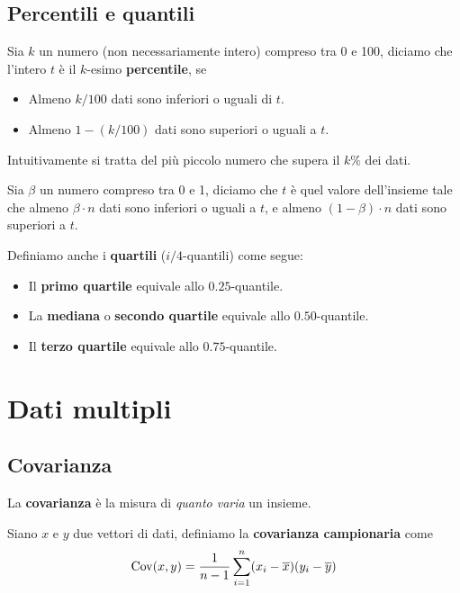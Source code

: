 \subsection{Percentili e quantili}

\begin{definition}
	Sia $k$ un numero (non necessariamente intero) compreso tra 0 e 100, diciamo che l'intero $t$
	è il $k$-esimo
	\textbf{percentile}, se
	\begin{itemize}
		\item Almeno $k / 100$ dati sono inferiori o uguali di $t$.
		\item Almeno $1 - (k / 100)$ dati sono superiori o uguali a $t$.
	\end{itemize}
	Intuitivamente si tratta del più piccolo numero che supera il $k \%$ dei dati.
\end{definition}

\begin{definition}
	Sia $\beta$ un numero compreso tra 0 e 1, diciamo che $t$ è quel valore dell'insieme tale che
	almeno $\beta \cdot n$ dati sono inferiori o uguali a $t$, e almeno $(1-\beta) \cdot n$ dati
	sono superiori a $t$.
\end{definition}

\begin{definition}
	Definiamo anche i \textbf{quartili} ($i/4$-quantili) come segue:
	\begin{itemize}
		\item Il \textbf{primo quartile} equivale allo $0.25$-quantile.
		\item La \textbf{mediana} o \textbf{secondo quartile} equivale allo $0.50$-quantile.
		\item Il \textbf{terzo quartile} equivale allo $0.75$-quantile.
	\end{itemize}
\end{definition}

\section{Dati multipli}
\subsection{Covarianza}
La \textbf{covarianza} è la misura di \emph{quanto varia} un insieme.

\begin{definition}
	Siano $x$  e $y$ due vettori di dati, definiamo la \textbf{covarianza campionaria} come
	\[ \operatorname{Cov}(x, y) = \frac{1}{n - 1} \sum_{i=1}^n (x_i - \overline{x}) (y_i - \overline{y}) \]
\end{definition}

